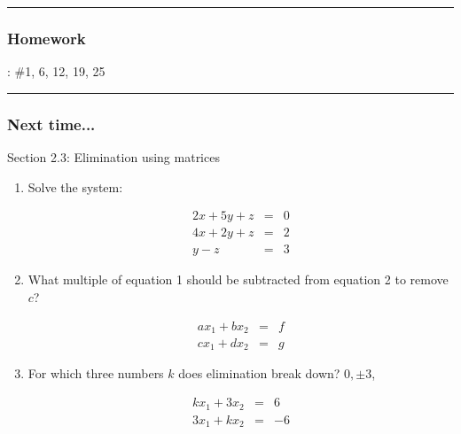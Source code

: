 \rule[0.01in]{\textwidth}{0.0025in}


\subsubsection*{Homework}
: \#1, 6, 12, 19, 25




\rule[0.01in]{\textwidth}{0.0025in}









\subsubsection*{Next time...}
Section 2.3: Elimination using matrices



\newpage

\begin{enumerate}

\item Solve the system:


\[
\begin{array}{rcr} 2x+5y+z & = & 0 \\ 4x+2y+z & = &2   \\  y-z & = &3 \end{array} 
\]



	\item What multiple of equation 1 should be subtracted from equation 2 to remove $c$?
	
	\[
	\begin{array}{rcl} a x_1 + b x_2 & = & f \\ cx_1 + d x_2 & = &g \end{array} 
	\]

% 
\item For which three numbers $k$ does elimination break down? $0, \pm3$,

\[
\begin{array}{rcr} k x_1 + 3 x_2 & = & 6 \\ 3x_1 +k  x_2 & = &-6 \end{array} 
\]




\end{enumerate}


